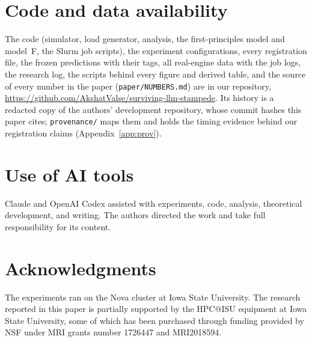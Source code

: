 \documentclass[10pt,twocolumn]{article}
\newcommand{\fpath}[1]{\nolinkurl{#1}}
\newcommand{\repourl}{\url{https://github.com/AkshatValse/surviving-llm-stampede}}
\theoremstyle{remark}
\begin{document}
\section*{Code and data availability}
{\raggedright The code (simulator, load generator, analysis, the first-principles model and model~F, the Slurm job scripts), the
experiment configurations, every registration file, the frozen predictions with their tags, all real-engine data with the job logs,
the research log, the scripts behind every figure and derived table, and the source of every number in the paper
(\fpath{paper/NUMBERS.md}) are in our repository, \repourl{}. Its history is a redacted copy of the authors' development repository,
whose commit hashes this paper cites; \fpath{provenance/} maps them and holds the timing evidence behind our registration claims
(Appendix~\ref{app:prov}).\par}

\section*{Use of AI tools}
Claude and OpenAI Codex assisted with experiments, code, analysis, theoretical development, and writing. The authors directed the work and take full responsibility for its content.

\section*{Acknowledgments}
The experiments ran on the Nova cluster at Iowa State University. The research reported in this paper is partially supported by the HPC@ISU equipment at Iowa State University, some of which has been purchased through funding provided by NSF under MRI grants number 1726447 and MRI2018594.




\clearpage
\appendix






\end{document}
